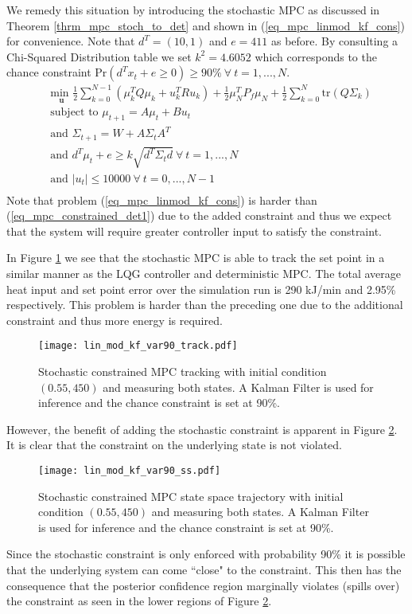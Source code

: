 We remedy this situation by introducing the stochastic MPC as discussed in Theorem \ref{thrm_mpc_stoch_to_det} and shown in (\ref{eq_mpc_linmod_kf_cons}) for convenience. Note that $d^T = (10, 1)$ and $e=411$ as before. By consulting a Chi-Squared Distribution table we set $k^2 = 4.6052$ which corresponds to the chance constraint $\text{Pr}(d^Tx_t + e \geq 0) \geq 90\% ~\forall ~t=1,...,N$.
\begin{equation}
\begin{aligned}
&\underset{\mathbf{u}}{\text{min }} \frac{1}{2}\sum_{k=0}^{N-1} \left( \mu_k^TQ\mu_k + u_k^TRu_k \right) + \frac{1}{2}\mu_N^TP_f\mu_N + \frac{1}{2}\sum_{k=0}^N \text{tr}(Q\Sigma_k) \\
& \text{subject to } \mu_{t+1}=A\mu_t + Bu_t \\
& \text{and } \Sigma_{t+1} = W+A\Sigma_t A^T \\
& \text{and } d^T\mu_t + e \geq k\sqrt{d^T \Sigma_t d} ~\forall ~t=1,...,N\\
& \text{and } |u_t| \leq 10000 ~\forall ~t=0,...,N-1\\
\end{aligned}
\label{eq_mpc_linmod_kf_cons}
\end{equation}
Note that problem (\ref{eq_mpc_linmod_kf_cons}) is harder than (\ref{eq_mpc_constrained_det1}) due to the added constraint and thus we expect that the system will require greater controller input to satisfy the constraint. 

In Figure \ref{fig_lin_mod_kf_var90_track} we see that the stochastic MPC is able to track the set point in a similar manner as the LQG controller and deterministic MPC. The total average heat input and set point error over the simulation run is 290 kJ/min and 2.95\% respectively. This problem is harder than the preceding one due to the additional constraint and thus more energy is required. 
\begin{figure}[H] 
\centering
\texttt{[image: lin\_mod\_kf\_var90\_track.pdf]}
\caption{Stochastic constrained MPC tracking with initial condition $(0.55, 450)$ and measuring both states. A Kalman Filter is used for inference and the chance constraint is set at 90\%.}
\label{fig_lin_mod_kf_var90_track}
\end{figure}
However, the benefit of adding the stochastic constraint is apparent in Figure \ref{fig_lin_mod_kf_var90_ss}. It is clear that the constraint on the underlying state is not violated.
\begin{figure}[H] 
\centering
\texttt{[image: lin\_mod\_kf\_var90\_ss.pdf]}
\caption{Stochastic constrained MPC state space trajectory with initial condition $(0.55, 450)$ and measuring both states. A Kalman Filter is used for inference and the chance constraint is set at 90\%.}
\label{fig_lin_mod_kf_var90_ss}
\end{figure}
Since the stochastic constraint is only enforced with probability 90\% it is possible that the underlying system can come ``close" to the constraint. This then has the consequence that the posterior confidence region marginally violates (spills over) the constraint as seen in the lower regions of Figure \ref{fig_lin_mod_kf_var90_ss}.

